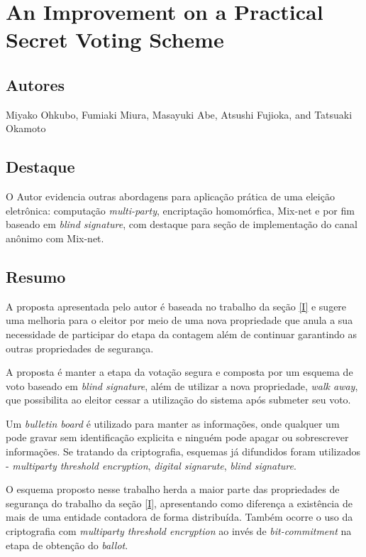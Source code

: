\documentclass[letterpaper, 12 pt, conference]{ieeeconf}
\begin{document}
\section{An Improvement on a Practical Secret Voting Scheme}
    \subsection{Autores}
        Miyako Ohkubo, Fumiaki Miura, Masayuki Abe, Atsushi Fujioka, and Tatsuaki Okamoto
    \subsection{Destaque}
        O Autor evidencia outras abordagens para aplicação prática de uma eleição eletrônica: computação \textit{multi-party}, encriptação homomórfica, Mix-net e por fim baseado em \textit{blind signature}, com destaque para seção de implementação do canal anônimo com Mix-net. 
    \subsection{Resumo}
        A proposta apresentada pelo autor é baseada no trabalho da seção \ref{I} e sugere uma melhoria para o eleitor por meio de uma nova propriedade que anula a sua necessidade de participar do etapa da contagem além de continuar garantindo as outras propriedades de segurança.
        
        A proposta é manter a etapa da votação segura e composta por um esquema de voto baseado em \textit{blind signature}, além de utilizar a nova propriedade, \textit{walk away}, que possibilita ao eleitor cessar a utilização do sistema após submeter seu voto.
        
        Um \textit{bulletin board} é utilizado para manter as informações, onde qualquer um pode gravar sem identificação explicita e ninguém pode apagar ou sobrescrever informações. Se tratando da criptografia, esquemas já difundidos foram utilizados - \textit{multiparty threshold encryption}, \textit{digital signarute}, \textit{blind signature}.
        
        O esquema proposto nesse trabalho herda a maior parte das propriedades de segurança do trabalho da seção \ref{I}, apresentando como diferença a existência de mais de uma entidade contadora de forma distribuída. Também ocorre o uso da criptografia com \textit{multiparty threshold encryption} ao invés de \textit{bit-commitment} na etapa de obtenção do \textit{ballot}.
        
\end{document}

